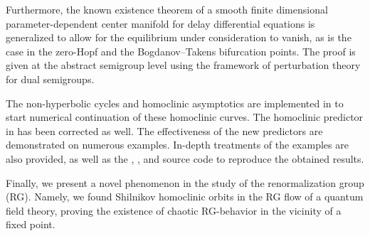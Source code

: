 Furthermore, the known existence theorem of a smooth finite dimensional
parameter-dependent center manifold for delay differential equations is
generalized to allow for the equilibrium under consideration to vanish, as is the
case in the zero-Hopf and the Bogdanov--Takens bifurcation points. The proof is
given at the abstract semigroup level using the framework of perturbation theory
for dual semigroups.

The non-hyperbolic cycles and homoclinic asymptotics are implemented in
\DDEBIFTOOL to start numerical continuation of these homoclinic curves. The
homoclinic predictor in \MATCONT has been corrected as well. The effectiveness of
the new predictors are demonstrated on numerous examples. In-depth treatments of
the examples are also provided, as well as the \MATLAB, \PYTHON, and \JULIA
source code to reproduce the obtained results.

Finally, we present a novel phenomenon in the study of the renormalization group
(RG). Namely, we found Shilnikov homoclinic orbits in the RG flow of a quantum
field theory, proving the existence of chaotic RG-behavior in the vicinity of a
fixed point.
